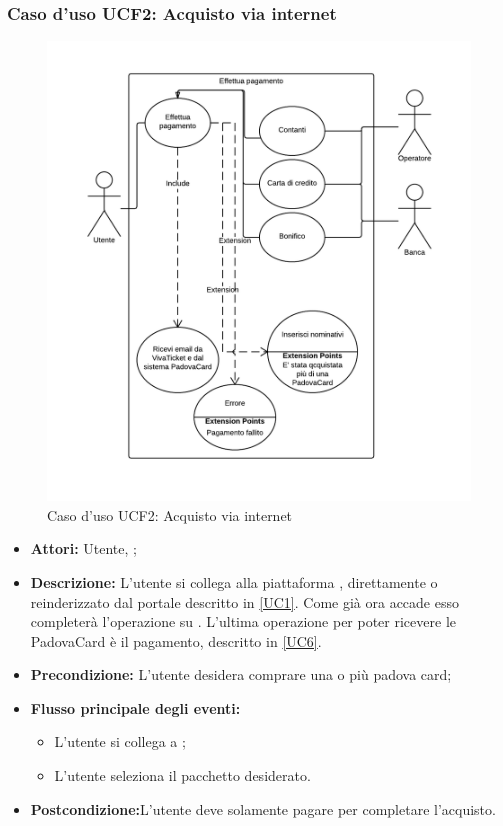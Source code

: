 \subsubsection{Caso d'uso UCF2: Acquisto via internet}
\begin{figure}[H]
\centering
\includegraphics[width=1\textwidth]{images/UCF2.png}
\caption{Caso d'uso UCF2: Acquisto via internet}
\end{figure}
\begin{itemize}
\item \textbf{Attori:} Utente, \charta;
\item \textbf{Descrizione:} L'utente si collega alla piattaforma \vivaticket, direttamente o reinderizzato dal portale descritto in \ref{UC1}. Come già ora accade esso completerà l'operazione su \vivaticket. L'ultima operazione per poter ricevere le PadovaCard è il pagamento, descritto in \ref{UC6}.
\item \textbf{Precondizione:} L'utente desidera comprare una o più padova card;
\item \textbf{Flusso principale degli eventi:}
	\begin{itemize}
		\item L'utente si collega a \vivaticket;
		\item L'utente seleziona il pacchetto desiderato.
	\end{itemize}
\item \textbf{Postcondizione:}L'utente deve solamente pagare per completare l'acquisto.
\end{itemize}

